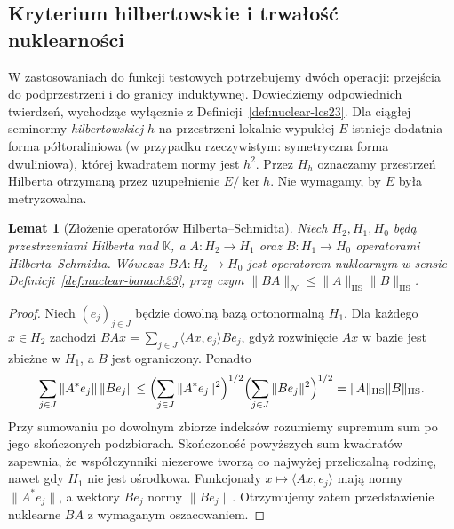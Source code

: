 \documentclass[11pt,a4paper]{article}
\numberwithin{equation}{section}
\theoremstyle{plain}
\newtheorem{lemat}[twierdzenie]{Lemat}
\theoremstyle{definition}
\theoremstyle{remark}
\newcommand{\K}{\mathbb K}
\begin{document}
\subsection{Kryterium hilbertowskie i trwałość nuklearności}
\label{subsec:nuclear-permanence23}

W zastosowaniach do funkcji testowych potrzebujemy dwóch operacji:
przejścia do podprzestrzeni i do granicy induktywnej. Dowiedziemy
odpowiednich twierdzeń, wychodząc wyłącznie z
Definicji~\ref{def:nuclear-lcs23}. Dla ciągłej seminormy
\emph{hilbertowskiej} $h$ na przestrzeni lokalnie wypukłej $E$
istnieje dodatnia forma półtoraliniowa (w przypadku rzeczywistym:
symetryczna forma dwuliniowa), której kwadratem normy jest $h^2$.
Przez $H_h$ oznaczamy przestrzeń Hilberta otrzymaną przez
uzupełnienie $E/\ker h$. Nie wymagamy, by $E$ była metryzowalna.

\begin{lemat}[Złożenie operatorów Hilberta--Schmidta]
\label{lem:hs-compose-nuclear23}
Niech $H_2,H_1,H_0$ będą przestrzeniami Hilberta nad $\K$, a
$A:H_2\to H_1$ oraz $B:H_1\to H_0$ operatorami
Hilberta--Schmidta. Wówczas $BA:H_2\to H_0$ jest
operatorem nuklearnym w sensie
Definicji~\ref{def:nuclear-banach23}, przy czym
$\|BA\|_{\mathcal N}\le\|A\|_{\mathrm{HS}}\|B\|_{\mathrm{HS}}$.
\end{lemat}
\begin{proof}
Niech $(e_j)_{j\in J}$ będzie dowolną bazą ortonormalną $H_1$.
Dla każdego $x\in H_2$ zachodzi
$BAx=\sum_{j\in J}\langle Ax,e_j\rangle Be_j$,
gdyż rozwinięcie $Ax$ w bazie jest zbieżne w $H_1$,
a $B$ jest ograniczony. Ponadto
\[
 \sum_{j\in J}\|A^*e_j\|\,\|Be_j\|
 \le\Bigl(\sum_{j\in J}\|A^*e_j\|^2\Bigr)^{1/2}
     \Bigl(\sum_{j\in J}\|Be_j\|^2\Bigr)^{1/2}
 =\|A\|_{\mathrm{HS}}\|B\|_{\mathrm{HS}}.
\]
Przy sumowaniu po dowolnym zbiorze indeksów rozumiemy supremum
sum po jego skończonych podzbiorach. Skończoność powyższych sum
kwadratów zapewnia, że współczynniki niezerowe tworzą
co najwyżej przeliczalną rodzinę, nawet gdy $H_1$ nie jest
ośrodkowa. Funkcjonały
$x\mapsto\langle Ax,e_j\rangle$ mają normy $\|A^*e_j\|$,
a wektory $Be_j$ normy $\|Be_j\|$. Otrzymujemy zatem
przedstawienie nuklearne $BA$ z wymaganym oszacowaniem.
\end{proof}
\end{document}
